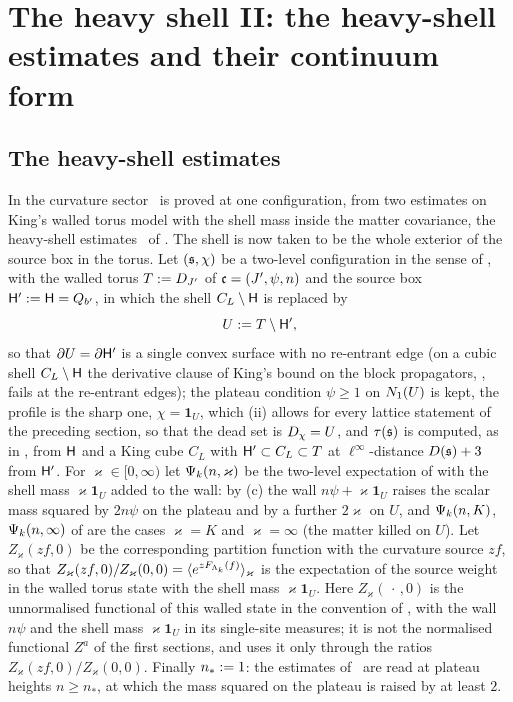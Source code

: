 \section{The heavy shell II: the heavy-shell estimates and their continuum form}

\subsection{The heavy-shell estimates}

In the curvature sector \REz\ is proved at one configuration, from two estimates on King's walled torus model with the shell mass inside the matter covariance, the heavy-shell estimates \HS\ of . The shell is now taken to be the whole exterior of the source box in the torus. Let $(\mathfrak s,\chi)$ be a two-level configuration in the sense of , with the walled torus $T:= D_{J'}$ of $\mathfrak c=(J',\psi,n)$ and the source box $\mathsf H':=\mathsf H=Q_{b'}$, in which the shell $C_L\setminus\mathsf H$ is replaced by
\[
U:= T\setminus\mathsf H' ,
\]
so that $\partial U=\partial\mathsf H'$ is a single convex surface with no re-entrant edge (on a cubic shell $C_L\setminus\mathsf H$ the derivative clause of King's bound on the block propagators, \cite[Thm.~3.3]{K1}, fails at the re-entrant edges); the plateau condition $\psi\ge1$ on $N_{1}(U)$ is kept, the profile is the sharp one, $\chi=\mathbf 1_U$, which (ii) allows for every lattice statement of the preceding section, so that the dead set is $D_\chi=U$, and $\tau(\mathfrak s)$ is computed, as in , from $\mathsf H$ and a King cube $C_L$ with $\mathsf H'\subset C_L\subset T$ at $\ell^\infty$-distance $D(\mathfrak s)+3$ from $\mathsf H'$. For $\varkappa\in[0,\infty)$ let $\Psi_k(n,\varkappa)$ be the two-level expectation of  with the shell mass $\varkappa\mathbf 1_U$ added to the wall: by (c) the wall $n\psi+\varkappa\mathbf 1_U$ raises the scalar mass squared by $2n\psi$ on the plateau and by a further $2\varkappa$ on $U$, and $\Psi_k(n,K)$, $\Psi_k(n,\infty)$ of  are the cases $\varkappa=K$ and $\varkappa=\infty$ (the matter killed on $U$). Let $Z_\varkappa(zf,0)$ be the corresponding partition function with the curvature source $zf$, so that $Z_\varkappa(zf,0)/Z_\varkappa(0,0)=\langle e^{zF_{\Lambda_k}(f)}\rangle_\varkappa$ is the expectation of the source weight in the walled torus state with the shell mass $\varkappa\mathbf 1_U$. Here $Z_\varkappa(\,\cdot\,,0)$ is the unnormalised functional of this walled state in the convention of , with the wall $n\psi$ and the shell mass $\varkappa\mathbf 1_U$ in its single-site measures; it is not the normalised functional $Z^a$ of the first sections, and  uses it only through the ratios $Z_\varkappa(zf,0)/Z_\varkappa(0,0)$. Finally $n_*:=1$: the estimates of \HS\ are read at plateau heights $n\ge n_*$, at which the mass squared on the plateau is raised by at least $2$.


